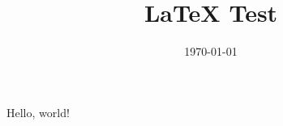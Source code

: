 \documentclass{article}
\title{LaTeX Test}
\date{\today}
\author{}
\begin{document}
\maketitle

Hello, world!
\end{document}
